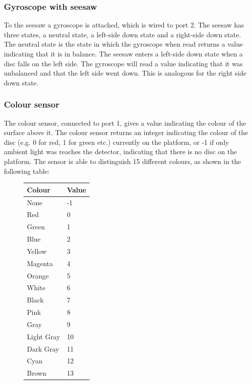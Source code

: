 \documentclass[a4paper,oneside,11pt]{article}
\begin{document}
\subsubsection{Gyroscope with seesaw}
To the seesaw a gyroscope is attached, which is wired to port 2. The seesaw has three states, a neutral state, a left-side down state and a right-side down state. The neutral state is the state in which the gyroscope when read returns a value indicating that it is in balance. The seesaw enters a left-side down state when a disc falls on the left side. The gyroscope will read a value indicating that it was unbalanced and that the left side went down.
This is analogous for the right side down state.

\subsubsection{Colour sensor}
The colour sensor, connected to port 1, gives a value indicating the colour of the surface above it. The colour sensor returns an integer indicating the colour of the disc (e.g. 0 for red, 1 for green etc.) currently on the platform, or -1 if only ambient light was reaches the detector, indicating that there is no disc on the platform. The sensor is able to distinguish 15 different colours, as shown in the following table:

\begin{figure}[H]
\begin{tabular}{|l|l|}
\hline
\textbf{Colour} & \textbf{Value} \\
\hline
None & -1 \\
Red & 0 \\
Green & 1 \\
Blue & 2 \\
Yellow & 3 \\
Magenta & 4 \\
Orange & 5 \\
White & 6 \\
Black & 7 \\
Pink & 8 \\
Gray & 9 \\
Light Gray & 10 \\
Dark Gray & 11 \\
Cyan & 12 \\
Brown & 13 \\
\hline
\end{tabular}
\end{figure}
\end{document}
